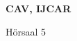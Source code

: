 \documentclass[a4paper]{article}
\begin{document}
\printGenericVSLHeader
\begin{center}
\begin{vsltext}{3cm}{4cm}

   \vspace{0.5cm} 

    \textbf{CAV, IJCAR} 

    \vspace{1.5cm}

    Hörsaal 5

\end{vsltext}

\end{center}
\end{document}
